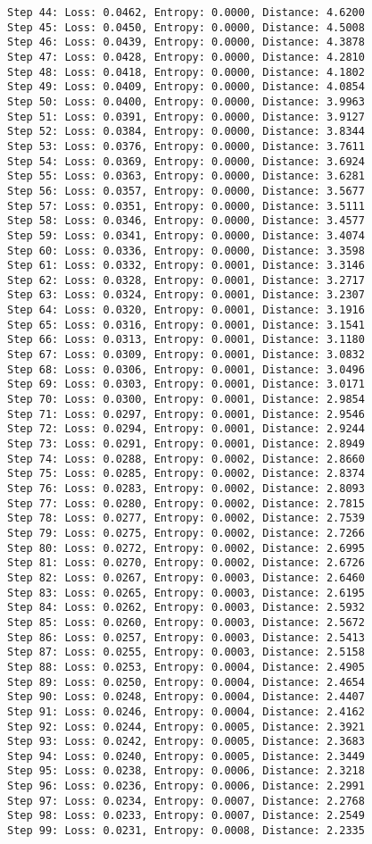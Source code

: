 \documentclass[11pt]{article}
\begin{document}
\begin{Verbatim}[commandchars=\\\{\}]
Step 44: Loss: 0.0462, Entropy: 0.0000, Distance: 4.6200
Step 45: Loss: 0.0450, Entropy: 0.0000, Distance: 4.5008
Step 46: Loss: 0.0439, Entropy: 0.0000, Distance: 4.3878
Step 47: Loss: 0.0428, Entropy: 0.0000, Distance: 4.2810
Step 48: Loss: 0.0418, Entropy: 0.0000, Distance: 4.1802
Step 49: Loss: 0.0409, Entropy: 0.0000, Distance: 4.0854
Step 50: Loss: 0.0400, Entropy: 0.0000, Distance: 3.9963
Step 51: Loss: 0.0391, Entropy: 0.0000, Distance: 3.9127
Step 52: Loss: 0.0384, Entropy: 0.0000, Distance: 3.8344
Step 53: Loss: 0.0376, Entropy: 0.0000, Distance: 3.7611
Step 54: Loss: 0.0369, Entropy: 0.0000, Distance: 3.6924
Step 55: Loss: 0.0363, Entropy: 0.0000, Distance: 3.6281
Step 56: Loss: 0.0357, Entropy: 0.0000, Distance: 3.5677
Step 57: Loss: 0.0351, Entropy: 0.0000, Distance: 3.5111
Step 58: Loss: 0.0346, Entropy: 0.0000, Distance: 3.4577
Step 59: Loss: 0.0341, Entropy: 0.0000, Distance: 3.4074
Step 60: Loss: 0.0336, Entropy: 0.0000, Distance: 3.3598
Step 61: Loss: 0.0332, Entropy: 0.0001, Distance: 3.3146
Step 62: Loss: 0.0328, Entropy: 0.0001, Distance: 3.2717
Step 63: Loss: 0.0324, Entropy: 0.0001, Distance: 3.2307
Step 64: Loss: 0.0320, Entropy: 0.0001, Distance: 3.1916
Step 65: Loss: 0.0316, Entropy: 0.0001, Distance: 3.1541
Step 66: Loss: 0.0313, Entropy: 0.0001, Distance: 3.1180
Step 67: Loss: 0.0309, Entropy: 0.0001, Distance: 3.0832
Step 68: Loss: 0.0306, Entropy: 0.0001, Distance: 3.0496
Step 69: Loss: 0.0303, Entropy: 0.0001, Distance: 3.0171
Step 70: Loss: 0.0300, Entropy: 0.0001, Distance: 2.9854
Step 71: Loss: 0.0297, Entropy: 0.0001, Distance: 2.9546
Step 72: Loss: 0.0294, Entropy: 0.0001, Distance: 2.9244
Step 73: Loss: 0.0291, Entropy: 0.0001, Distance: 2.8949
Step 74: Loss: 0.0288, Entropy: 0.0002, Distance: 2.8660
Step 75: Loss: 0.0285, Entropy: 0.0002, Distance: 2.8374
Step 76: Loss: 0.0283, Entropy: 0.0002, Distance: 2.8093
Step 77: Loss: 0.0280, Entropy: 0.0002, Distance: 2.7815
Step 78: Loss: 0.0277, Entropy: 0.0002, Distance: 2.7539
Step 79: Loss: 0.0275, Entropy: 0.0002, Distance: 2.7266
Step 80: Loss: 0.0272, Entropy: 0.0002, Distance: 2.6995
Step 81: Loss: 0.0270, Entropy: 0.0002, Distance: 2.6726
Step 82: Loss: 0.0267, Entropy: 0.0003, Distance: 2.6460
Step 83: Loss: 0.0265, Entropy: 0.0003, Distance: 2.6195
Step 84: Loss: 0.0262, Entropy: 0.0003, Distance: 2.5932
Step 85: Loss: 0.0260, Entropy: 0.0003, Distance: 2.5672
Step 86: Loss: 0.0257, Entropy: 0.0003, Distance: 2.5413
Step 87: Loss: 0.0255, Entropy: 0.0003, Distance: 2.5158
Step 88: Loss: 0.0253, Entropy: 0.0004, Distance: 2.4905
Step 89: Loss: 0.0250, Entropy: 0.0004, Distance: 2.4654
Step 90: Loss: 0.0248, Entropy: 0.0004, Distance: 2.4407
Step 91: Loss: 0.0246, Entropy: 0.0004, Distance: 2.4162
Step 92: Loss: 0.0244, Entropy: 0.0005, Distance: 2.3921
Step 93: Loss: 0.0242, Entropy: 0.0005, Distance: 2.3683
Step 94: Loss: 0.0240, Entropy: 0.0005, Distance: 2.3449
Step 95: Loss: 0.0238, Entropy: 0.0006, Distance: 2.3218
Step 96: Loss: 0.0236, Entropy: 0.0006, Distance: 2.2991
Step 97: Loss: 0.0234, Entropy: 0.0007, Distance: 2.2768
Step 98: Loss: 0.0233, Entropy: 0.0007, Distance: 2.2549
Step 99: Loss: 0.0231, Entropy: 0.0008, Distance: 2.2335
    \end{Verbatim}
\end{document}
